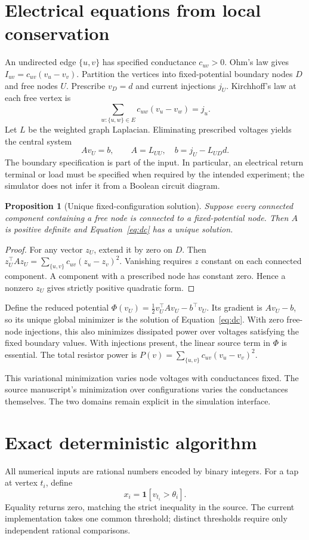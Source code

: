 \documentclass[11pt]{article}
\newtheorem{proposition}{Proposition}
\begin{document}
\section{Electrical equations from local conservation}
An undirected edge $\{u,v\}$ has specified conductance $c_{uv}>0$.
Ohm's law gives $I_{uv}=c_{uv}(v_u-v_v)$.
Partition the vertices into fixed-potential boundary nodes $D$ and free
nodes $U$. Prescribe $v_D=d$ and current injections $j_U$.
Kirchhoff's law at each free vertex is
\[
\sum_{w:\{u,w\}\in E}c_{uw}(v_u-v_w)=j_u.
\]
Let $L$ be the weighted graph Laplacian. Eliminating prescribed voltages
yields the central system
\begin{equation}
\boxed{A v_U=b,\qquad A=L_{UU},\quad b=j_U-L_{UD}d.}
\label{eq:dc}
\end{equation}
The boundary specification is part of the input. In particular, an
electrical return terminal or load must be specified when required by
the intended experiment; the simulator does not infer it from a Boolean
circuit diagram.

\begin{proposition}[Unique fixed-configuration solution]
Suppose every connected component containing a free node is connected
to a fixed-potential node. Then $A$ is positive definite and
Equation~\eqref{eq:dc} has a unique solution.
\end{proposition}
\begin{proof}
For any vector $z_U$, extend it by zero on $D$. Then
$z_U^\top A z_U=\sum_{\{u,v\}}c_{uv}(z_u-z_v)^2$.
Vanishing requires $z$ constant on each connected component. A component
with a prescribed node has constant zero. Hence a nonzero $z_U$ gives
strictly positive quadratic form.
\end{proof}

Define the reduced potential
$\Phi(v_U)=\frac12v_U^\top A v_U-b^\top v_U$.
Its gradient is $Av_U-b$, so its unique global minimizer is the solution
of Equation~\eqref{eq:dc}. With zero free-node injections, this also
minimizes dissipated power over voltages satisfying the fixed boundary
values. With injections present, the linear source term in $\Phi$ is
essential. The total resistor power is
$P(v)=\sum_{\{u,v\}}c_{uv}(v_u-v_v)^2$.

This variational minimization varies node voltages with conductances
fixed. The source manuscript's minimization over configurations varies
the conductances themselves. The two domains remain explicit in the
simulation interface.

\section{Exact deterministic algorithm}
All numerical inputs are rational numbers encoded by binary integers.
For a tap at vertex $t_i$, define
\begin{equation}
x_i=\mathbf1[v_{t_i}>\theta_i].
\label{eq:tap}
\end{equation}
Equality returns zero, matching the strict inequality in the source.
The current implementation takes one common threshold; distinct
thresholds require only independent rational comparisons.
\end{document}

